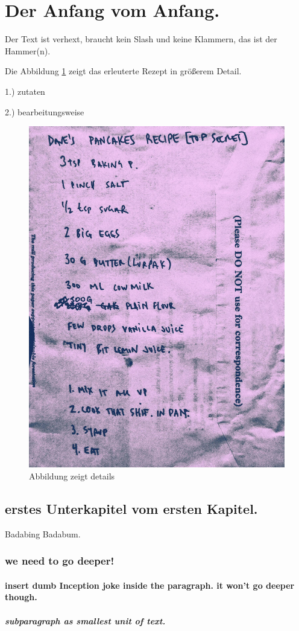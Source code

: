 \section{Der Anfang vom Anfang.}
    Der Text ist verhext, braucht kein Slash und keine Klammern, 
    das ist der Hammer(n).
    
        Die Abbildung \ref{fig:DAVES_PANCAKES_RECIPE} zeigt das erleuterte Rezept
        in größerem Detail. 

        1.) zutaten

        2.) bearbeitungsweise

        \begin{figure}[H]
            \centering
            \includegraphics[width=0.5\linewidth]{graphics/DAVES_PANCAKES_RECIPE.jpg}
            \caption[cooles rezept]{Abbildung zeigt details}
    
            
            \label{fig:DAVES_PANCAKES_RECIPE}
        \end{figure}
        
        \subsection {erstes Unterkapitel vom ersten Kapitel.}
        Badabing Badabum.

            \subsubsection{we need to go deeper!}

                \paragraph{insert dumb Inception joke inside the paragraph. it won't go deeper though.} 
                   
                    \subparagraph{subparagraph as smallest unit of text.}

        
